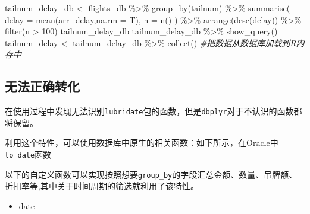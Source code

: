 \documentclass[
]{book}
\newenvironment{Shaded}{\begin{snugshade}}{\end{snugshade}}
\newcommand{\AttributeTok}[1]{\textcolor[rgb]{0.77,0.63,0.00}{#1}}
\newcommand{\CommentTok}[1]{\textcolor[rgb]{0.56,0.35,0.01}{\textit{#1}}}
\newcommand{\DecValTok}[1]{\textcolor[rgb]{0.00,0.00,0.81}{#1}}
\newcommand{\FunctionTok}[1]{\textcolor[rgb]{0.00,0.00,0.00}{#1}}
\newcommand{\NormalTok}[1]{#1}
\newcommand{\OtherTok}[1]{\textcolor[rgb]{0.56,0.35,0.01}{#1}}
\newcommand{\SpecialCharTok}[1]{\textcolor[rgb]{0.00,0.00,0.00}{#1}}
\providecommand{\tightlist}{%
  \setlength{\itemsep}{0pt}\setlength{\parskip}{0pt}}
\begin{document}
\begin{Shaded}
\begin{Highlighting}[]
\NormalTok{tailnum\_delay\_db }\OtherTok{\textless{}{-}}\NormalTok{ flights\_db }\SpecialCharTok{\%\textgreater{}\%} 
  \FunctionTok{group\_by}\NormalTok{(tailnum) }\SpecialCharTok{\%\textgreater{}\%}
  \FunctionTok{summarise}\NormalTok{(}
    \AttributeTok{delay =} \FunctionTok{mean}\NormalTok{(arr\_delay,}\AttributeTok{na.rm =}\NormalTok{ T),}
    \AttributeTok{n =} \FunctionTok{n}\NormalTok{()}
\NormalTok{  ) }\SpecialCharTok{\%\textgreater{}\%} 
  \FunctionTok{arrange}\NormalTok{(}\FunctionTok{desc}\NormalTok{(delay)) }\SpecialCharTok{\%\textgreater{}\%}
  \FunctionTok{filter}\NormalTok{(n }\SpecialCharTok{\textgreater{}} \DecValTok{100}\NormalTok{)}
\NormalTok{tailnum\_delay\_db}
\NormalTok{tailnum\_delay\_db }\SpecialCharTok{\%\textgreater{}\%} \FunctionTok{show\_query}\NormalTok{()}
\NormalTok{tailnum\_delay }\OtherTok{\textless{}{-}}\NormalTok{ tailnum\_delay\_db }\SpecialCharTok{\%\textgreater{}\%} \FunctionTok{collect}\NormalTok{() }\CommentTok{\#把数据从数据库加载到R内存中}
\end{Highlighting}
\end{Shaded}

\hypertarget{ux65e0ux6cd5ux6b63ux786eux8f6cux5316}{%
\subsection{无法正确转化}\label{ux65e0ux6cd5ux6b63ux786eux8f6cux5316}}

在使用过程中发现无法识别\texttt{lubridate}包的函数，但是\texttt{dbplyr}对于不认识的函数都将保留。

利用这个特性，可以使用数据库中原生的相关函数：如下所示，在Oracle中\texttt{to\_date}函数

以下的自定义函数可以实现按照想要\texttt{group\_by}的字段汇总金额、数量、吊牌额、折扣率等,其中关于时间周期的筛选就利用了该特性。

\begin{itemize}
\tightlist
\item
  date
\end{itemize}
\end{document}
